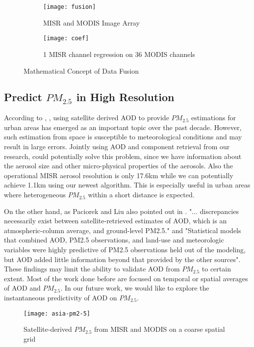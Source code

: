 \begin{figure}[h!]
    \centering
    \begin{subfigure}{.45\textwidth}
        \centering
        \texttt{[image: fusion]}
        \caption{MISR and MODIS Image Array}
    \end{subfigure}
    \begin{subfigure}{.45\textwidth}
        \centering
        \texttt{[image: coef]}
        \caption{1 MISR channel regression on 36 MODIS channels}
    \end{subfigure}
    \caption{Mathematical Concept of Data Fusion}
    \label{fig:fusion}
\end{figure}

\newpage
\subsection{Predict $PM_{2.5}$ in High Resolution}
According to \cite{paciorek2012}, \cite{you2015}, using satellite derived AOD to provide $PM_{2.5}$ estimations for urban areas has emerged as an important topic over the past decade. However, such estimation from space is susceptible to meteorological conditions and may result in large errors. Jointly using AOD and component retrieval from our research, could potentially solve this problem, since we have information about the aerosol size and other micro-physical properties of the aerosols. Also the operational MISR aerosol resolution is only 17.6km while we can potentially achieve 1.1km using our newest algorithm. This is especially useful in urban areas where heterogeneous $PM_{2.5}$ within a short distance is expected.

On the other hand, as Paciorek and Liu also pointed out in \cite{liu2007}. "... discrepancies necessarily exist between satellite-retrieved estimates of AOD, which is an atmospheric-column average, and ground-level PM2.5." and "Statistical models that combined AOD, PM2.5 observations, and land-use and meteorologic variables were highly predictive of PM2.5 observations held out of the modeling, but AOD added little information beyond that provided by the other sources". These findings may limit the ability to validate AOD from $PM_{2.5}$ to certain extent. Most of the work done before are focused on temporal or spatial averages of AOD and $PM_{2.5}$. In our future work, we would like to explore the instantaneous predictivity of AOD on $PM_{2.5}$.

\begin{figure}[h!]
    \centering
    \texttt{[image: asia-pm2-5]}
    \caption{Satellite-derived $PM_{2.5}$ from MISR and MODIS on a coarse spatial grid}
    \label{fig:pm2_5}
\end{figure}

